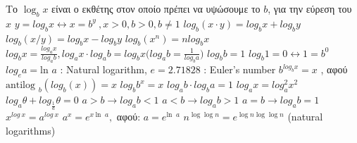 \documentclass[12pt]{article}
\def\ln{\text{ln\ }} %
\def\antilog{\text{antilog\ }} %
\begin{document}
\begin{flushleft}
	\textgreek{Το} $ \log_b x $ \textgreek{είναι ο εκθέτης στον οποίο πρέπει να υψώσουμε το } $ b$\textgreek{, για την εύρεση του} $x$ \linebreak 
	\textbullet \quad $ y = log_b x \leftrightarrow x = b^y \ , x> 0 , b>0, b\neq 1 $ \linebreak 
	\textbullet \quad $\displaystyle  log_b (x\cdot y) = log_b x + log_b y $ \linebreak 
	\textbullet \quad $\displaystyle  log_b (x / y) = log_b x - log_b y $ \linebreak 
	\textbullet \quad $\displaystyle  log_b (x^n) = n log_b x $ \linebreak 
	\textbullet \quad $\displaystyle log_b x = \frac{log_a x}{log_a b} , log_a x \cdot log_a b = log_b x \big( log_a b = \frac{1}{log_b a} \big) $ \linebreak 
	\textbullet \quad $\displaystyle  log_b b = 1 $ \linebreak 
	\textbullet \quad $\displaystyle  log_b 1 = 0 \leftrightarrow 1 = b^0 $ \linebreak 
	\textbullet \quad $\displaystyle  log_e a = \ln a $  :  Natural logarithm, $e = 2.71828$  :  Euler's number \linebreak 
	\textbullet \quad $\displaystyle b^{log_b x} = x $ , \textgreek{αφού} $\displaystyle \antilog_b (log_b (x)) = x $ \linebreak 
	\textbullet \quad $\displaystyle  log_b b^x = x $ \linebreak 
	\textbullet \quad $\displaystyle  log_a b \cdot log_b a = 1 $ \linebreak 
	\textbullet \quad $\displaystyle  log_a x = log_a^2 x^2 $ \linebreak 
	\textbullet \quad $\displaystyle log_a \theta + log_{\frac{1}{a}} \theta = 0 $ \linebreak 
	\textbullet \quad $\displaystyle  a > b \rightarrow log_a b < 1 $ \linebreak 
	\textbullet \quad $\displaystyle  a < b \rightarrow log_a b > 1 $ \linebreak 
	\textbullet \quad $\displaystyle  a = b \rightarrow log_a b = 1 $ \linebreak 
	\textbullet \quad $\displaystyle  x^{log \ x} = a^{log \ x} $ \linebreak 
	\textbullet \quad $\displaystyle  a^x = e^{x\ \ln \ a} , $ \textgreek{αφού}: $ a = e^{\ln \ a} $ \linebreak 
	\textbullet \quad $\displaystyle n^{\log \log n} = e^{\log n \log \log n}$ (natural logarithms) \linebreak 
	

\end{flushleft}
\end{document}
